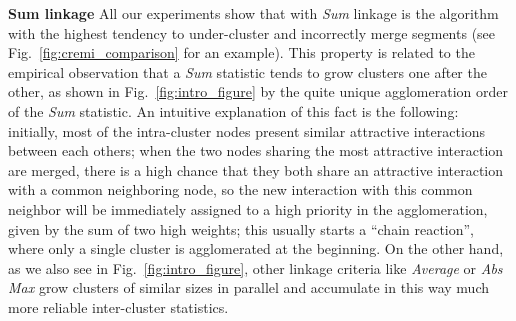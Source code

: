 \textbf{Sum linkage } 
All our experiments show that \algname{} with \emph{Sum} linkage is the algorithm with the highest tendency to under-cluster and incorrectly merge segments (see Fig.\ \ref{fig:cremi_comparison} for an example). This property is related to the empirical observation that a \emph{Sum} statistic tends to grow clusters one after the other, as shown in Fig.\ \ref{fig:intro_figure} by the quite unique agglomeration order of the \emph{Sum} statistic. An intuitive explanation of this fact is the following: initially, most of the intra-cluster nodes present similar attractive interactions between each others; when the two nodes sharing the most attractive interaction are merged, there is a high chance that they both share an attractive interaction with a common neighboring node, so the new interaction with this common neighbor will be immediately assigned to a high priority in the agglomeration, given by the sum of two high weights; this usually starts a ``chain reaction'', where only a single cluster is agglomerated at the beginning. On the other hand, as we also see in Fig.\ \ref{fig:intro_figure}, other linkage criteria like \emph{Average} or \emph{Abs Max} grow clusters of similar sizes in parallel and accumulate in this way much more reliable inter-cluster statistics.





